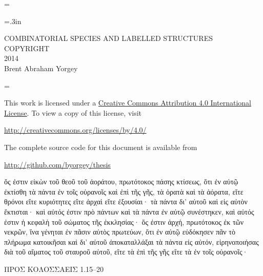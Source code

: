 \documentclass[12pt,oneside]{book}
\newcommand{\Title}{COMBINATORIAL SPECIES AND LABELLED STRUCTURES}
\begin{document}
\normalsize\parskip=\oldparskip

\newpage

\thispagestyle{empty}
\begin{pagecentered}
\doublespaced
\parskip=.3in

\Title \\
COPYRIGHT \\
2014 \\
Brent Abraham Yorgey \bigskip

\singlespaced
\parskip=\oldparskip

This work is licensed under a
\href{http://creativecommons.org/licenses/by/4.0/}{Creative Commons
  Attribution 4.0 International License}.  To view a copy of this
license, visit \bigskip

\url{http://creativecommons.org/licenses/by/4.0/} \bigskip

The complete source code for this document is available from \bigskip

\url{http://github.com/byorgey/thesis}
\end{pagecentered}

\newpage

\begin{pagecentered}

%



\begingroup
{} \large

ὅς ἐστιν εἰκὼν τοῦ θεοῦ τοῦ ἀοράτου, πρωτότοκος πάσης κτίσεως, ὅτι ἐν
αὐτῷ ἐκτίσθη τὰ πάντα ἐν τοῖς οὐρανοῖς καὶ ἐπὶ τῆς γῆς, τὰ ὁρατὰ καὶ
τὰ ἀόρατα, εἴτε θρόνοι εἴτε κυριότητες εἴτε ἀρχαὶ εἴτε ἐξουσίαι· τὰ
πάντα δι’ αὐτοῦ καὶ εἰς αὐτὸν ἔκτισται· καὶ αὐτός ἐστιν πρὸ πάντων καὶ
τὰ πάντα ἐν αὐτῷ συνέστηκεν, καὶ αὐτός ἐστιν ἡ κεφαλὴ τοῦ σώματος τῆς
ἐκκλησίας· ὅς ἐστιν ἀρχή, πρωτότοκος ἐκ τῶν νεκρῶν, ἵνα γένηται ἐν
πᾶσιν αὐτὸς πρωτεύων, ὅτι ἐν αὐτῷ εὐδόκησεν πᾶν τὸ πλήρωμα κατοικῆσαι
καὶ δι’ αὐτοῦ ἀποκαταλλάξαι τὰ πάντα εἰς αὐτόν, εἰρηνοποιήσας διὰ τοῦ
αἵματος τοῦ σταυροῦ αὐτοῦ, εἴτε τὰ ἐπὶ τῆς γῆς εἴτε τὰ ἐν τοῖς
οὐρανοῖς· \bigskip

\normalsize \hfill ΠΡΟΣ ΚΟΛΟΣΣΑΕΙΣ 1.15--20

\endgroup

\end{pagecentered}
\end{document}
